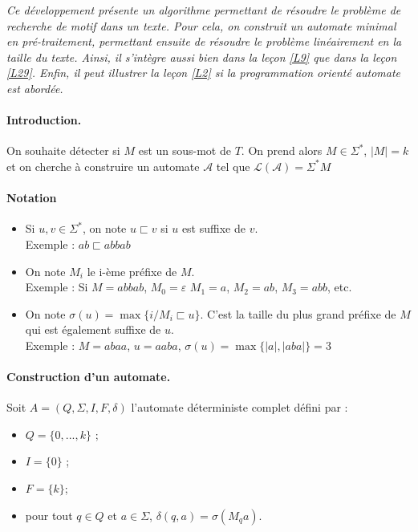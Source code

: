 
\textit{Ce développement présente un algorithme permettant de résoudre le problème de recherche de motif dans un texte. Pour cela, on construit un automate minimal en pré-traitement, permettant ensuite de résoudre le problème linéairement en la taille du texte. Ainsi, il s'intègre aussi bien dans la leçon \ref{L9} que dans la leçon \ref{L29}. Enfin, il peut illustrer la leçon \ref{L2} si la programmation orienté automate est abordée.}

\paragraph{Introduction.} On souhaite détecter si $M$ est un sous-mot de $T$. On prend alors $M \in \Sigma^*$, $|M| = k$ et on cherche à construire un automate $\mathcal A$ tel que $\mathcal L (\mathcal A) = \Sigma^* M$

\paragraph{Notation}\begin{itemize}[label=$\bullet$]
	\item Si $u,v\in \Sigma^*$, on note $u \sqsubset v$ si $u$ est suffixe de $v$.\\
	\hspace*{-\leftmargin} Exemple : $ab \sqsubset abbab$
	\item On note $M_i$ le i-ème préfixe de $M$.\\
	\hspace*{-\leftmargin} Exemple : Si $M=abbab$, $M_0 = \varepsilon$ $M_1 = a$, $M_2 = ab$, $M_3 = abb$, etc.
	\item On note $\sigma(u) = \max\{i / M_i \sqsubset u\}$. C'est la taille du plus grand préfixe de $M$ qui est également suffixe de $u$. \\
	\hspace*{-\leftmargin} Exemple : $M = abaa$, $u = aaba$, \qquad $\sigma(u) = \max\{|a|, |aba|\} = 3$
\end{itemize}
 

\paragraph{Construction d'un automate.} Soit $A=(Q,\Sigma, I,F,\delta)$ l'automate déterministe complet défini par :
\begin{itemize}
\item $Q=\{0,...,k\}$ ;
\item $I=\{0\}$ ;
\item $F=\{k\}$;
\item pour tout $q\in Q$ et $a\in \Sigma$, $\delta(q,a) = \sigma(M_qa)$.
\end{itemize}

